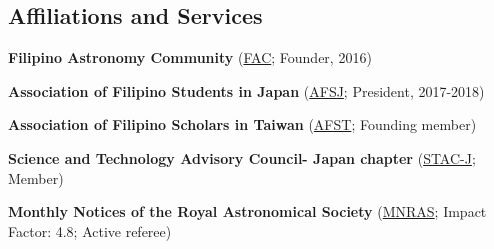 \documentclass[12pt,letterpaper]{article}
\begin{document}

\subsection{Affiliations and Services}
\begin{list}{}{\cvlist}
    \item \textbf{Filipino Astronomy Community} (\href{https://www.facebook.com/groups/filastrocomm}{FAC}; Founder, 2016)
    \item \textbf{Association of Filipino Students in Japan} (\href{https://www.facebook.com/afsjpage}{AFSJ}; President, 2017-2018)
    \item \textbf{Association of Filipino Scholars in Taiwan} (\href{https://www.facebook.com/AssocIskolar}{AFST}; Founding member)
    \item \textbf{Science and Technology Advisory Council- Japan chapter} (\href{https://www.facebook.com/profile.php?id=100083271798519}{STAC-J}; Member)
    \item \textbf{Monthly Notices of the Royal Astronomical Society} (\href{https://academic.oup.com/mnras}{MNRAS}; Impact Factor: 4.8; Active referee)
\end{list}
\end{document}
